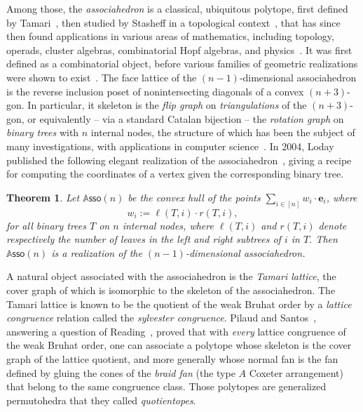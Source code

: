 \documentclass{amsart}
\newtheorem{theorem}{Theorem}%
\theoremstyle{definition}
\newcommand{\darkblue}{\color{darkblue}} %
\newcommand{\defn}[1]{\textsl{\darkblue #1}} %
\newcommand{\polytope}[1]{\mathds{#1}} %
\newcommand{\Asso}{\polytope{A}\mathsf{sso}} %
\begin{document}
Among those, the \defn{associahedron} is a classical, ubiquitous polytope, first defined by Tamari~\cite{T51}, then studied by Stasheff in a topological context~\cite{S63}, that has since then found applications in various areas of mathematics, including topology, operads, cluster algebras, combinatorial Hopf algebras, and physics~\cite{MR4675114}. It was first defined as a combinatorial object, before various families of geometric realizations were shown to exist~\cite{MR1022776,MR1941227,MR2108555,MR3437894}.
The face lattice of the $(n-1)$-dimensional associahedron is the reverse inclusion poset of nonintersecting diagonals of a convex $(n+3)$-gon. In particular, it skeleton is the \defn{flip graph} on \defn{triangulations} of the $(n+3)$-gon, or equivalently -- via a standard Catalan bijection -- the \defn{rotation graph} on \defn{binary trees} with $n$ internal nodes, the structure of which has been the subject of many investigations, with applications in computer science~\cite{MR928904,MR3197650}.
In 2004, Loday published the following elegant realization of the associahedron~\cite{MR2108555}, giving a recipe for computing the coordinates of a vertex given the corresponding binary tree.

\begin{theorem}
  \label{thm:loday}
  Let $\Asso (n)$ be the convex hull of the points
  $\sum_{i\in [n]} w_i\cdot \mathbf{e}_i$, where
  \[
  w_i := \ell(T, i)\cdot r(T,i),
  \]
  for all binary trees $T$ on $n$ internal nodes, where $\ell(T,i)$ and $r(T,i)$ denote respectively the number of leaves in the left and right subtrees of $i$ in $T$.
  Then $\Asso (n)$ is a realization of the $(n-1)$-dimensional associahedron.
\end{theorem}

A natural object associated with the associahedron is the \defn{Tamari lattice}, the cover graph of which is isomorphic to the skeleton of the associahedron. The Tamari lattice is known to be the quotient of the weak Bruhat order by a \defn{lattice congruence} relation called the \defn{sylvester congruence}. Pilaud and Santos~\cite{MR3964495}, answering a question of Reading~\cite{MR2142177}, proved that with \emph{every} lattice congruence of the weak Bruhat order, one can associate a polytope whose skeleton is the cover graph of the lattice quotient, and more generally whose normal fan is the fan defined by gluing the cones of the \defn{braid fan} (the type $A$ Coxeter arrangement) that belong to the same congruence class. Those polytopes are generalized permutohedra that they called \defn{quotientopes}.
\end{document}
